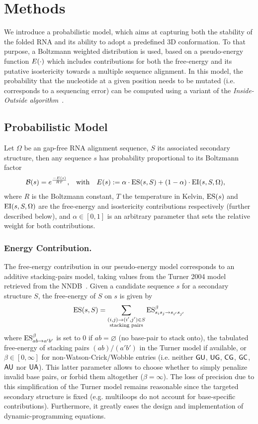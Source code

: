 
\section{Methods}
\label{sec:methods}

We introduce a probabilistic model, which aims at capturing both the stability of the folded RNA and its ability to adopt a predefined 3D conformation.
To that purpose, a Boltzmann weighted distribution is used, based on a pseudo-energy function $E(\cdot)$ which includes contributions for both the free-energy and its putative isostericity towards a multiple sequence alignment. In this model, the probability that the nucleotide at a given position needs to be mutated (i.e. corresponds to a sequencing error) can be computed using a variant of the \emph{Inside-Outside algorithm}~\cite{Lari1990}.

\subsection{Probabilistic Model}
Let $\Omega$ be an gap-free RNA alignment sequence, $S$ its associated secondary structure, 
then any sequence $s$ has probability proportional to its Boltzmann factor
\begin{align*}
  \mathcal{B}(s) &= e^\frac{-E(s)}{RT}, &&\text{with}&E(s)&:=\alpha\cdot\text{ES}(s,S)+(1-\alpha)\cdot\text{EI}(s,S,\Omega),
\end{align*}
where $R$ is the Boltzmann constant, $T$ the temperature in Kelvin, $\text{ES}(s)$ and $\text{EI}(s,S,\Omega)$ 
are the free-energy and isostericity contributions respectively (further described below), and $\alpha\in[0,1]$ is an arbitrary parameter that sets the relative weight for both contributions.

\subsubsection{Energy Contribution.}
The free-energy contribution in our pseudo-energy model corresponds to an additive stacking-pairs model, taking values from the Turner 2004 model retrieved from the NNDB~\cite{Turner2010}. Given a candidate sequence $s$ for a secondary structure $S$, the free-energy of $S$ on $s$ is given by
\begin{align*}
  \text{ES}(s,S) = \sum_{\substack{(i,j)\to (i',j')\in S\\ \text{stacking pairs}}}\text{ES}^{\beta}_{s_is_j\to s_{i'}s_{j'}} 
\end{align*}
where $\text{ES}^{\beta}_{ab\to a'b'}$ is set to $0$ if $ab=\varnothing$ (no base-pair to stack onto), the tabulated free-energy of stacking pairs $(ab)/(a'b')$ in the Turner model if available, or $\beta\in[0,\infty]$ for non-Watson-Crick/Wobble entries (i.e. neither ${\sf{G}}{\sf{U}}$, ${\sf{U}}{\sf{G}}$, ${\sf{C}}{\sf{G}}$, ${\sf{G}}{\sf{C}}$, ${\sf{A}}{\sf{U}}$ nor ${\sf{U}}{\sf{A}}$). This latter parameter allows to choose whether to simply penalize invalid base pairs, or forbid them altogether ($\beta = \infty$).
The loss of precision due to this simplification of the Turner model remains reasonable since the targeted secondary structure is fixed 
(e.g. multiloops do not account for base-specific contributions). Furthermore, it greatly eases the design and implementation of dynamic-programming equations. 
